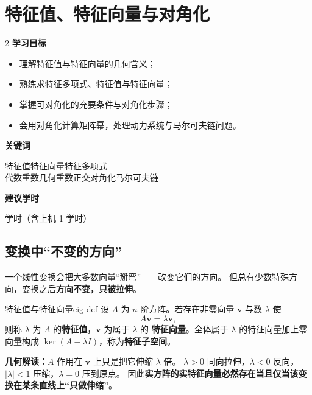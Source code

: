 \documentclass[11pt,a4paper,openany]{ctexbook}
\begin{document}
\chapter{特征值、特征向量与对角化}
\label{ch:eig}

\begin{chapoutline}
\small
\begin{multicols}{2}
\textbf{学习目标}
\begin{itemize}[leftmargin=1.5em, itemsep=1.5pt]
\item 理解特征值与特征向量的几何含义；
\item 熟练求特征多项式、特征值与特征向量；
\item 掌握可对角化的充要条件与对角化步骤；
\item 会用对角化计算矩阵幂，处理动力系统与马尔可夫链问题。
\end{itemize}
\columnbreak
\textbf{关键词}
\par\smallskip
特征值\quad 特征向量\quad 特征多项式\\
代数重数\quad 几何重数\quad 正交对角化\quad 马尔可夫链
\par\smallskip
\textbf{建议学时}
\par{} 学时（含上机 1 学时）
\end{multicols}
\end{chapoutline}

\section{变换中“不变的方向”}

一个线性变换会把大多数向量“掰弯”——改变它们的方向。
但总有少数特殊方向，变换之后\textbf{方向不变，只被拉伸}。

\begin{defn}{特征值与特征向量}{eig-def}
设 $A$ 为 $n$ 阶方阵。若存在非零向量 $\boldsymbol{v}$ 与数 $\lambda$ 使
\[
A\boldsymbol{v}=\lambda\boldsymbol{v},
\]
则称 $\lambda$ 为 $A$ 的\textbf{特征值}，$\boldsymbol{v}$ 为属于 $\lambda$ 的
\textbf{特征向量}。全体属于 $\lambda$ 的特征向量加上零向量构成
$\ker(A-\lambda I)$，称为\textbf{特征子空间}。
\end{defn}

\begin{keypoint}
\textbf{几何解读：}$A$ 作用在 $\boldsymbol{v}$ 上只是把它伸缩 $\lambda$ 倍。
$\lambda>0$ 同向拉伸，$\lambda<0$ 反向，$|\lambda|<1$ 压缩，$\lambda=0$ 压到原点。
因此\textbf{实方阵的实特征向量必然存在当且仅当该变换在某条直线上“只做伸缩”}。
\end{keypoint}
\end{document}
